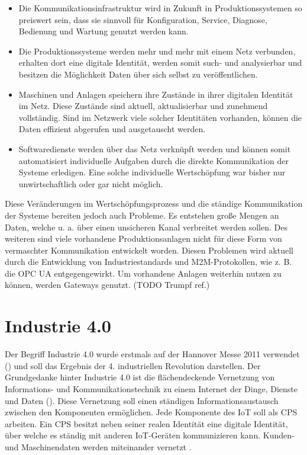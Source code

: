 \begin{itemize}
  \item Die Kommunikationsinfrastruktur wird in Zukunft in Produktionssystemen so preiswert sein, dass sie sinnvoll für Konfiguration, Service, Diagnose, Bedienung und Wartung genutzt werden kann.
  \item Die Produktionssysteme werden mehr und mehr mit einem Netz verbunden, erhalten dort eine digitale Identität, werden somit such- und analysierbar und besitzen die Möglichkeit Daten über sich selbst zu veröffentlichen. 
  \item Maschinen und Anlagen speichern ihre Zustände in ihrer digitalen Identität im Netz. Diese Zustände sind aktuell, aktualisierbar und zunehmend vollständig. Sind im Netzwerk viele solcher Identitäten vorhanden, können die Daten effizient abgerufen und ausgetauscht werden.
  \item Softwaredienste werden über das Netz verknüpft werden und können somit automatisiert individuelle Aufgaben durch die direkte Kommunikation der Systeme erledigen. Eine solche individuelle Wertschöpfung war bisher nur unwirtschaftlich oder gar nicht möglich.
\end{itemize}

Diese Veränderungen im Wertschöpfungsprozess und die ständige Kommunikation der Systeme bereiten jedoch auch Probleme. Es entstehen große Mengen an Daten, welche u. a. über einen unsicheren Kanal verbreitet werden sollen. Des weiteren sind viele vorhandene Produktionsanlagen nicht für diese Form von vermaschter Kommunikation entwickelt worden. Diesen Problemen wird aktuell durch die Entwicklung von Industriestandards und \ac{M2M}-Protokollen, wie z. B. die \ac{OPC UA} entgegengewirkt. Um vorhandene Anlagen weiterhin nutzen zu können, werden Gateways genutzt. (TODO Trumpf ref.)

\section{Industrie 4.0}
Der Begriff Industrie 4.0 wurde erstmals auf der Hannover Messe 2011 verwendet (\cite{drath2014}) und soll das Ergebnis der 4. industriellen Revolution darstellen. Der Grundgedanke hinter Industrie 4.0 ist die flächendeckende Vernetzung von Informations- und Kommunikationstechnik zu einem Internet der Dinge, Dienste und Daten (\cite{Spath2013}). Diese Vernetzung soll einen ständigen Informationsaustausch zwischen den Komponenten ermöglichen. Jede Komponente des \ac{IoT} soll als \ac{CPS} arbeiten. Ein \ac{CPS} besitzt neben seiner realen Identität eine digitale Identität, über welche es ständig mit anderen \ac{IoT}-Geräten kommunizieren kann. Kunden- und Maschinendaten werden miteinander vernetzt \cite{rami2016}.


